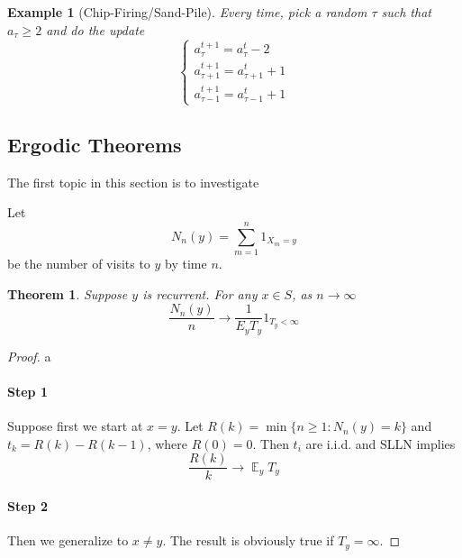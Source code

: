 \documentclass{article}
\newtheorem{Thm}{Theorem}[section]
\newtheorem{Eg}{Example}[section]
\theoremstyle{definition}
\newcommand{\EE}{\operatorname{\mathbb{E}}}
\renewcommand{\geq}{\geqslant}
\newcommand{\<}{\left\langle}
\renewcommand{\>}{\right\rangle}
\begin{document}
\begin{Eg}[Chip-Firing/Sand-Pile]
    Every time, pick a random $\tau$ such that $a_\tau\geq 2$ and do the update 
    \[\left\{\begin{matrix}
        a_\tau^{t+1} = a_\tau^{t} -2 \\
        a_{\tau+1}^{t+1}= a_{\tau+1}^{t}+1  \\
        a_{\tau-1}^{t+1}= a_{\tau-1}^{t}+1
        \end{matrix}\right.\]
\end{Eg}

\subsection{Ergodic Theorems}
The first topic in this section is to investigate 

Let \[N_n(y)=\sum_{m=1}^{n}1_{X_m=y} \] 
be the number of visits to $y$ by time $n$.

\begin{Thm}
    Suppose $y$ is recurrent. For any $x\in S$, as $n\to\infty$ 
    \[ \frac{N_n(y)}{n}\to \frac{1}{E_y T_y}1_{T_y<\infty} \]
\end{Thm}
\begin{proof}
    a
    \paragraph{Step 1} Suppose first we start at $x=y$. Let $R(k)=\min \{n\geq 1:N_n(y)=k \}$ and $t_k=R(k)-R(k-1)$, where $R(0)=0$.
    Then $t_i$ are i.i.d. and SLLN implies \[\frac{R(k)}{k}\to \EE_y T_y \] 

    \paragraph{Step 2} Then we generalize to $x\ne y$. The result is obviously true if $T_y=\infty$.
\end{proof}
\end{document}
